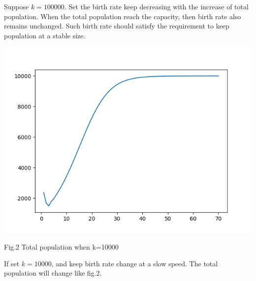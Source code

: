 \documentclass{article}
\begin{document}
\begin{enumerate}
Suppose $k=100000$. Set the birth rate keep decreasing with the increase of total population. When the total population reach the capacity, then birth rate also remains unchanged. Such birth rate should satisfy the requirement to keep population at a stable size.
\begin{center}
\includegraphics[scale=0.7]{graph.png}

Fig.2 Total population when k=10000
\end{center}

If set $k=10000$, and keep birth rate change at a slow speed. The total population will change like fig.2.


\end{enumerate}
\end{document}
